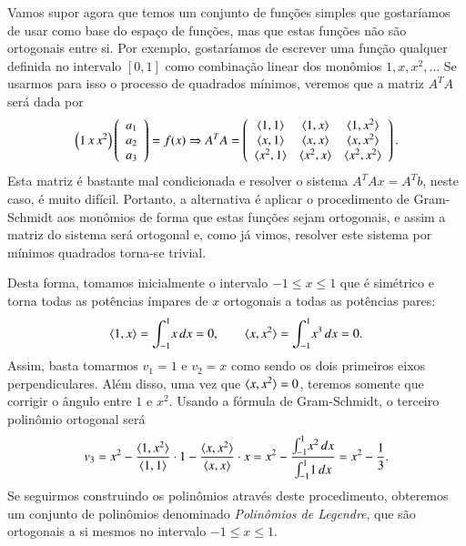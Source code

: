 Vamos supor agora que temos um conjunto de funções simples que gostaríamos de usar como base do espaço de funções, mas que estas funções não são ortogonais entre si. Por exemplo, gostaríamos de escrever uma função qualquer definida no intervalo $[0,1]$ como combinação linear dos monômios $1,x,x^2,\ldots$ Se usarmos para isso o processo de quadrados mínimos, veremos que a matriz $A^TA$ será dada por
\begin{equation*}
  \left( 1 \, x \, x^2 \right) \left(
    \begin{array}{c}
      a_1\\
      a_2\\
      a_3
    \end{array}
  \right) = f(x) \Rightarrow A^TA = \left( 
    \begin{array}{c c c}
      \langle 1, 1 \rangle & \langle 1, x \rangle & \langle 1, x^2 \rangle\\
      \langle x, 1 \rangle & \langle x, x \rangle & \langle x, x^2 \rangle\\
      \langle x^2, 1 \rangle & \langle x^2, x \rangle & \langle x^2, x^2 \rangle
    \end{array}
  \right).
\end{equation*}
Esta matriz é bastante mal condicionada e resolver o sistema $A^TAx=A^Tb$, neste caso, é muito difícil. Portanto, a alternativa é aplicar o procedimento de Gram-Schmidt aos monômios de forma que estas funções sejam ortogonais, e assim a matriz do sistema será ortogonal e, como já vimos, resolver este sistema por mínimos quadrados torna-se trivial.

Desta forma, tomamos inicialmente o intervalo $-1\leq x \leq 1$ que é simétrico e torna todas as potências ímpares de $x$ ortogonais a todas as potências pares:
\begin{equation*}
  \langle 1, x \rangle = \int_{-1}^1 \! x\, dx = 0, \qquad \langle x, x^2 \rangle = \int_{-1}^1 \! x^3\, dx = 0.
\end{equation*}
Assim, basta tomarmos $v_1=1$ e $v_2=x$ como sendo os dois primeiros eixos perpendiculares. Além disso, uma vez que $\langle x, x^2 \rangle=0$, teremos somente que corrigir o ângulo entre $1$ e $x^2$. Usando a fórmula de Gram-Schmidt, o terceiro polinômio ortogonal será
\begin{equation*}
  v_3 = x^2-\frac{\langle 1, x^2 \rangle}{\langle 1, 1 \rangle} \cdot 1- \frac{\langle x, x^2 \rangle}{\langle x, x \rangle} \cdot x = x^2 - \frac{\int_{-1}^1 \! x^2\, dx}{\int_{-1}^1 \! 1\, dx} = x^2-\frac{1}{3}.
\end{equation*}
Se seguirmos construindo os polinômios através deste procedimento, obteremos um conjunto de polinômios denominado \emph{Polinômios de Legendre}, que são ortogonais a si mesmos no intervalo $-1\leq x\leq 1$.
